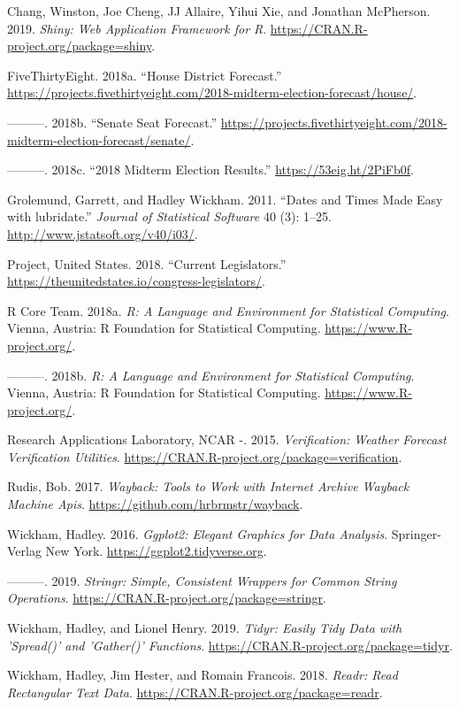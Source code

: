 \documentclass[]{article}
\begin{document}
\hypertarget{refs}{}
\leavevmode\hypertarget{ref-shiny}{}%
Chang, Winston, Joe Cheng, JJ Allaire, Yihui Xie, and Jonathan
McPherson. 2019. \emph{Shiny: Web Application Framework for R}.
\url{https://CRAN.R-project.org/package=shiny}.

\leavevmode\hypertarget{ref-house_district_forecast}{}%
FiveThirtyEight. 2018a. ``House District Forecast.''
\url{https://projects.fivethirtyeight.com/2018-midterm-election-forecast/house/}.

\leavevmode\hypertarget{ref-senate_seat_forecast}{}%
---------. 2018b. ``Senate Seat Forecast.''
\url{https://projects.fivethirtyeight.com/2018-midterm-election-forecast/senate/}.

\leavevmode\hypertarget{ref-forecast_results_2018}{}%
---------. 2018c. ``2018 Midterm Election Results.''
\url{https://53eig.ht/2PiFb0f}.

\leavevmode\hypertarget{ref-lubridate}{}%
Grolemund, Garrett, and Hadley Wickham. 2011. ``Dates and Times Made
Easy with lubridate.'' \emph{Journal of Statistical Software} 40 (3):
1--25. \url{http://www.jstatsoft.org/v40/i03/}.

\leavevmode\hypertarget{ref-legislators_current}{}%
Project, United States. 2018. ``Current Legislators.''
\url{https://theunitedstates.io/congress-legislators/}.

\leavevmode\hypertarget{ref-base}{}%
R Core Team. 2018a. \emph{R: A Language and Environment for Statistical
Computing}. Vienna, Austria: R Foundation for Statistical Computing.
\url{https://www.R-project.org/}.

\leavevmode\hypertarget{ref-stats}{}%
---------. 2018b. \emph{R: A Language and Environment for Statistical
Computing}. Vienna, Austria: R Foundation for Statistical Computing.
\url{https://www.R-project.org/}.

\leavevmode\hypertarget{ref-verification}{}%
Research Applications Laboratory, NCAR -. 2015. \emph{Verification:
Weather Forecast Verification Utilities}.
\url{https://CRAN.R-project.org/package=verification}.

\leavevmode\hypertarget{ref-wayback}{}%
Rudis, Bob. 2017. \emph{Wayback: Tools to Work with Internet Archive
Wayback Machine Apis}. \url{https://github.com/hrbrmstr/wayback}.

\leavevmode\hypertarget{ref-ggplot2}{}%
Wickham, Hadley. 2016. \emph{Ggplot2: Elegant Graphics for Data
Analysis}. Springer-Verlag New York.
\url{https://ggplot2.tidyverse.org}.

\leavevmode\hypertarget{ref-stringr}{}%
---------. 2019. \emph{Stringr: Simple, Consistent Wrappers for Common
String Operations}. \url{https://CRAN.R-project.org/package=stringr}.

\leavevmode\hypertarget{ref-tidyr}{}%
Wickham, Hadley, and Lionel Henry. 2019. \emph{Tidyr: Easily Tidy Data
with 'Spread()' and 'Gather()' Functions}.
\url{https://CRAN.R-project.org/package=tidyr}.

\leavevmode\hypertarget{ref-readr}{}%
Wickham, Hadley, Jim Hester, and Romain Francois. 2018. \emph{Readr:
Read Rectangular Text Data}.
\url{https://CRAN.R-project.org/package=readr}.
\end{document}
